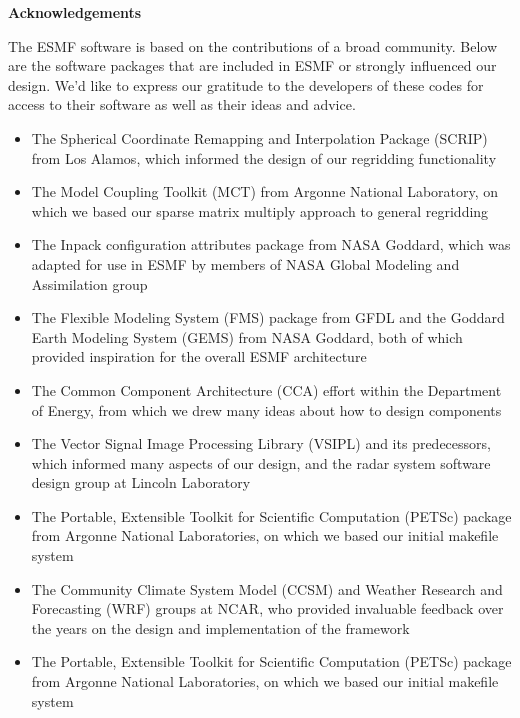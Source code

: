 
\vspace{2in}
\begin{center}
{\bf Acknowledgements}
\end{center}

The ESMF software is based on the contributions of a broad community.
Below are the software packages that are included in ESMF or strongly 
influenced our design.  We'd like to express our gratitude to the 
developers of these codes for access to their software as well as their 
ideas and advice.

\begin{itemize}

\item The Spherical Coordinate Remapping and Interpolation Package (SCRIP) 
from Los Alamos, which informed the design of our regridding functionality

\item The Model Coupling Toolkit (MCT) from Argonne National Laboratory,
on which we based our sparse matrix multiply approach to general 
regridding

\item The Inpack configuration attributes package from NASA Goddard, 
which was adapted for use in ESMF by members of NASA Global Modeling and 
Assimilation group

\item The Flexible Modeling System (FMS) package from GFDL and the 
Goddard Earth Modeling System (GEMS) from NASA Goddard, both of which 
provided inspiration for the overall ESMF architecture 

\item The Common Component Architecture (CCA) effort within the Department
of Energy, from which we drew many ideas about how to design components

\item The Vector Signal Image Processing Library (VSIPL) and its
predecessors, which informed many aspects of our design, and the 
radar system software design group at Lincoln Laboratory

\item The Portable, Extensible Toolkit for Scientific Computation (PETSc) 
package from Argonne National Laboratories, on which we 
based our initial makefile system

\item The Community Climate System Model (CCSM) and Weather Research and
Forecasting (WRF) groups at NCAR, who provided invaluable feedback over
the years on the design and implementation of the framework

\item The Portable, Extensible Toolkit for Scientific Computation (PETSc) 
package from Argonne National Laboratories, on which we 
based our initial makefile system

\end{itemize}